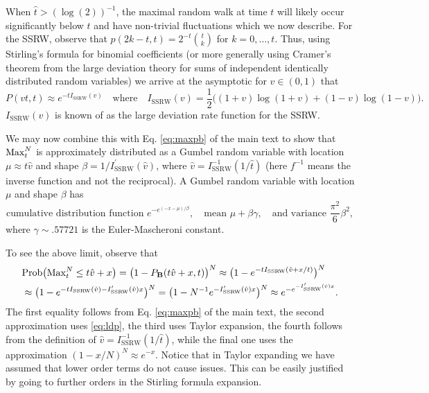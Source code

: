 When $\hat{t}> (\log(2))^{-1}$, the maximal random walk at time $t$ will likely occur significantly below $t$ and have non-trivial fluctuations which we now describe. For the SSRW, observe that $p(2k-t,t) =2^{-t} {t\choose k}$ for $k=0,\ldots, t$. Thus, using Stirling's formula for binomial coefficients (or more generally using Cramer's theorem from the large deviation theory for sums of independent identically distributed random variables) we arrive at the asymptotic for $v\in (0,1)$ that
\begin{equation}\label{eq:ldp}
P(vt,t) \approx e^{- t I_{\mathrm{SSRW}}(v)}\quad\textrm{where}\quad I_{\mathrm{SSRW}}(v) = \frac{1}{2}\big((1+v)\log(1+v) + (1-v)\log(1-v)\big).
\end{equation}
$I_{\mathrm{SSRW}}(v)$ is known of as the large deviation rate function for the SSRW.

We may now combine this with Eq. \eqref{eq:maxpb}  of the main text to show that
$\mathrm{Max}^{N}_t$ is approximately distributed as a Gumbel random variable with location
$\mu \approx t\hat v$ and shape  $\beta= 1/I_{\mathrm{SSRW}}^{\prime}(\hat v)$, where $\hat v=I_{\mathrm{SSRW}}^{-1}(1/\hat{t})$ (here $f^{-1}$ means the inverse function and not the reciprocal). A Gumbel random variable with location $\mu$ and shape $\beta$ has
\begin{equation}\label{eq:Gumbel}
\textrm{cumulative distribution function } e^{-e^{(-x-\mu)/\beta}},\quad \textrm{mean } \mu+\beta\gamma, \quad \textrm{and variance } \frac{\pi^2}{6}\beta^2,
\end{equation}
where $\gamma\sim .57721$ is the Euler-Mascheroni constant.


To see the above limit, observe that
\begin{align*}
&\mathrm{Prob}\big(\mathrm{Max}^{N}_t \leq t\hat{v}+x\big) = \big(1-P_{\mathbf{B}}(t\hat{v}+x,t)\big)^N \approx \big(1-  e^{- t I_{\mathrm{SSRW}}(\hat{v}+x/t)} \big)^N\\
&\approx \big(1-  e^{- t I_{\mathrm{SSRW}}(\hat{v}) - I'_{\mathrm{SSRW}}(\hat{v})x} \big)^N
=  \big(1-  N^{-1} e^{- I'_{\mathrm{SSRW}}(\hat{v})x} \big)^N \approx e^{-e^{- I'_{\mathrm{SSRW}}(\hat{v})x}}.
\end{align*}
The first equality follows from  Eq. \eqref{eq:maxpb}  of the main text, the second approximation uses \eqref{eq:ldp}, the third uses Taylor expansion, the fourth follows from the definition of $\hat v=I_{\mathrm{SSRW}}^{-1}(1/\hat{t})$, while the final one uses the approximation $(1-x/N)^{N}\approx e^{-x}$. Notice that in Taylor expanding we have assumed that lower order terms do not cause issues. This can be easily justified by going to further orders in the Stirling formula expansion.

